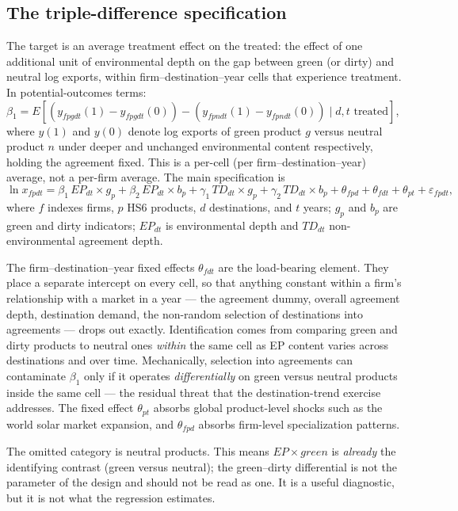 \documentclass[12pt]{article}
\begin{document}
\subsection{The triple-difference specification}

The target is an average treatment effect on the treated: the effect of one additional
unit of environmental depth on the gap between green (or dirty) and neutral log exports,
within firm--destination--year cells that experience treatment. In potential-outcomes
terms: $\beta_1 = E[(y_{fpgdt}(1)-y_{fpgdt}(0)) - (y_{fpndt}(1)-y_{fpndt}(0)) \mid d,t
\text{ treated}]$, where $y(1)$ and $y(0)$ denote log exports of green product $g$ versus
neutral product $n$ under deeper and unchanged environmental content respectively, holding
the agreement fixed. This is a per-cell (per firm--destination--year) average, not a
per-firm average. The main specification is
\begin{equation}\label{eq:main}
\ln x_{fpdt} = \beta_1\, EP_{dt}\!\times\!g_p + \beta_2\, EP_{dt}\!\times\!b_p
+ \gamma_1\, TD_{dt}\!\times\!g_p + \gamma_2\, TD_{dt}\!\times\!b_p
+ \theta_{fpd} + \theta_{fdt} + \theta_{pt} + \varepsilon_{fpdt},
\end{equation}
where $f$ indexes firms, $p$ HS6 products, $d$ destinations, and $t$ years; $g_p$ and
$b_p$ are green and dirty indicators; $EP_{dt}$ is environmental depth and $TD_{dt}$
non-environmental agreement depth.

The firm--destination--year fixed effects $\theta_{fdt}$ are the load-bearing element.
They place a separate intercept on every cell, so that anything constant within a firm's
relationship with a market in a year --- the agreement dummy, overall agreement depth,
destination demand, the non-random selection of destinations into agreements --- drops
out exactly. Identification comes from comparing green and dirty products to neutral ones
\emph{within} the same cell as EP content varies across destinations and over time.
Mechanically, selection into agreements can contaminate $\beta_1$ only if it operates
\emph{differentially} on green versus neutral products inside the same cell --- the
residual threat that the destination-trend exercise addresses. The fixed effect $\theta_{pt}$
absorbs global product-level shocks such as the world solar market expansion, and
$\theta_{fpd}$ absorbs firm-level specialization patterns.

The omitted category is neutral products. This means $EP \times \mathit{green}$ is
\emph{already} the identifying contrast (green versus neutral); the green--dirty
differential is not the parameter of the design and should not be read as one. It is a
useful diagnostic, but it is not what the regression estimates.
\end{document}
